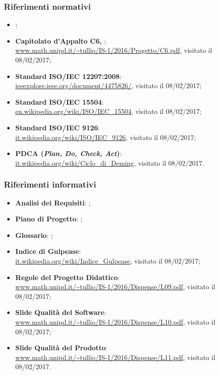 		\subsubsection{Riferimenti normativi}
		\begin{itemize}
			\item \NdP;
			\item \textbf{Capitolato d'Appalto C6, \proj}: \\
			\url{www.math.unipd.it/~tullio/IS-1/2016/Progetto/C6.pdf}, visitato il 08/02/2017;
			\item \textbf{Standard ISO/IEC 12207:2008}: \\
			\url{ieeexplore.ieee.org/document/4475826/}, visitato il 08/02/2017;
			\item \textbf{Standard ISO/IEC 15504}: \\
			\url{en.wikipedia.org/wiki/ISO/IEC_15504}, visitato il 08/02/2017;
			\item \textbf{Standard ISO/IEC 9126}: \\
			\url{it.wikipedia.org/wiki/ISO/IEC_9126}, visitato il 08/02/2017;
			\item \textbf{PDCA (\emph{Plan, Do, Check, Act})}: \\
			\url{it.wikipedia.org/wiki/Ciclo_di_Deming}, visitato il 08/02/2017.
		\end{itemize}
		
		\subsubsection{Riferimenti informativi}
		\begin{itemize}
			\item \textbf{Analisi dei Requisiti}: \AdR;
			\item \textbf{Piano di Progetto}: \PdP;
			\item \textbf{Glossario}: \Glossario;
			\item \textbf{Indice di Gulpease}: \\
			\url{it.wikipedia.org/wiki/Indice_Gulpease}, visitato il 08/02/2017;
			\item \textbf{Regole del Progetto Didattico}: \\
			\url{www.math.unipd.it/~tullio/IS-1/2016/Dispense/L09.pdf}, visitato il 08/02/2017;
			\item \textbf{Slide Qualità del Software}: \\
			\url{www.math.unipd.it/~tullio/IS-1/2016/Dispense/L10.pdf}, visitato il 08/02/2017;
			\item \textbf{Slide Qualità del Prodotto}: \\
			\url{www.math.unipd.it/~tullio/IS-1/2016/Dispense/L11.pdf}, visitato il 08/02/2017.
		\end{itemize}



